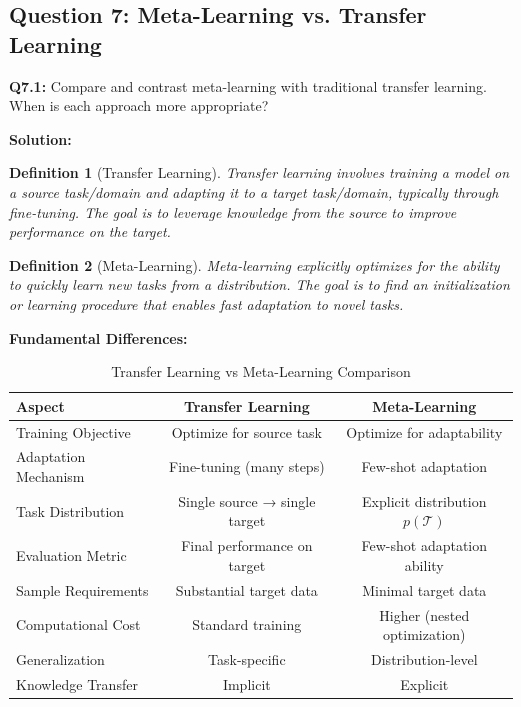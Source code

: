 \documentclass[12pt]{article}
\newcommand{\ieee}[1]{\textcolor{IEEEBlue}{\textbf{#1}}}
\newtheorem{definition}{Definition}
\begin{document}
{{			\subsection{Question 7: Meta-Learning vs. Transfer Learning}
			
			\textbf{Q7.1:} Compare and contrast meta-learning with traditional transfer learning. When is each approach more appropriate?
			
			\textbf{Solution:}
			
			\begin{definition}[Transfer Learning]
			Transfer learning involves training a model on a source task/domain and adapting it to a target task/domain, typically through fine-tuning. The goal is to leverage knowledge from the source to improve performance on the target.
			\end{definition}
			
			\begin{definition}[Meta-Learning]
			Meta-learning explicitly optimizes for the ability to quickly learn new tasks from a distribution. The goal is to find an initialization or learning procedure that enables fast adaptation to novel tasks.
			\end{definition}
			
			\ieee{Fundamental Differences:}
			
			\begin{table}[H]
			\centering
			\caption{Transfer Learning vs Meta-Learning Comparison}
			\begin{tabular}{@{}lcc@{}}
			\toprule
			\textbf{Aspect} & \textbf{Transfer Learning} & \textbf{Meta-Learning} \\
			\midrule
			Training Objective & Optimize for source task & Optimize for adaptability \\
			Adaptation Mechanism & Fine-tuning (many steps) & Few-shot adaptation \\
			Task Distribution & Single source → single target & Explicit distribution $p(\mathcal{T})$ \\
			Evaluation Metric & Final performance on target & Few-shot adaptation ability \\
			Sample Requirements & Substantial target data & Minimal target data \\
			Computational Cost & Standard training & Higher (nested optimization) \\
			Generalization & Task-specific & Distribution-level \\
			Knowledge Transfer & Implicit & Explicit \\
			\bottomrule
			\end{tabular}
			\label{tab:transfer_vs_meta}
			\end{table}
			
}}
\end{document}
